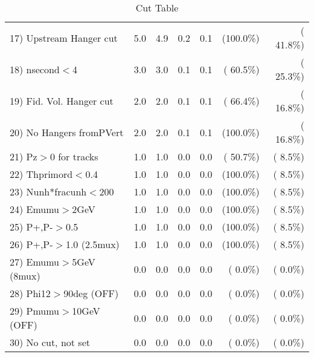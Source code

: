 \begin{table}[h!]
\begin{tabular}{||l||r|r|r|r|r|r||}
 17) Upstream Hanger cut  &          5.0 &          4.9 &          0.2 &          0.1 & (100.0\%) & ( 41.8\%) \\
 18) nsecond$<$4          &          3.0 &          3.0 &          0.1 &          0.1 & ( 60.5\%) & ( 25.3\%) \\
 19) Fid. Vol. Hanger cut &          2.0 &          2.0 &          0.1 &          0.1 & ( 66.4\%) & ( 16.8\%) \\
 20) No Hangers fromPVert &          2.0 &          2.0 &          0.1 &          0.1 & (100.0\%) & ( 16.8\%) \\
 21) Pz$>$0 for tracks    &          1.0 &          1.0 &          0.0 &          0.0 & ( 50.7\%) & (  8.5\%) \\
 22) Thprimord$<$0.4      &          1.0 &          1.0 &          0.0 &          0.0 & (100.0\%) & (  8.5\%) \\
 23) Nunh*fracunh$<$200   &          1.0 &          1.0 &          0.0 &          0.0 & (100.0\%) & (  8.5\%) \\
 24) Emumu$>$2GeV         &          1.0 &          1.0 &          0.0 &          0.0 & (100.0\%) & (  8.5\%) \\
 25) P+,P-$>$0.5          &          1.0 &          1.0 &          0.0 &          0.0 & (100.0\%) & (  8.5\%) \\
 26) P+,P-$>$1.0 (2.5mux) &          1.0 &          1.0 &          0.0 &          0.0 & (100.0\%) & (  8.5\%) \\
 27) Emumu$>$5GeV  (8mux) &          0.0 &          0.0 &          0.0 &          0.0 & (  0.0\%) & (  0.0\%) \\
 28) Phi12$>$90deg  (OFF) &          0.0 &          0.0 &          0.0 &          0.0 & (  0.0\%) & (  0.0\%) \\
 29) Pmumu$>$10GeV  (OFF) &          0.0 &          0.0 &          0.0 &          0.0 & (  0.0\%) & (  0.0\%) \\
 30) No cut, not set      &          0.0 &          0.0 &          0.0 &          0.0 & (  0.0\%) & (  0.0\%) \\
 \hline
 \hline
 \end{tabular}
 \caption{Cut Table           }
 \label{tab-cutcohjpsi-mumu_cohrho0}
 \end{table}
